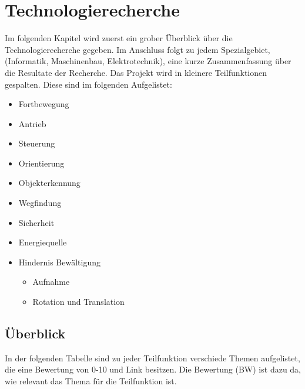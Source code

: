 \documentclass[../main.tex]{subfiles}
\begin{document}
\newpage
\section{Technologierecherche}

Im folgenden Kapitel wird zuerst ein grober Überblick über die Technologierecherche gegeben. Im Anschluss folgt zu jedem Spezialgebiet, (Informatik, Maschinenbau, Elektrotechnik), eine kurze Zusammenfassung über die Resultate der Recherche. Das Projekt wird in kleinere Teilfunktionen gespalten. Diese sind im folgenden Aufgelistet:
\begin{itemize}
    \item Fortbewegung
    \item Antrieb
    \item Steuerung
    \item Orientierung
    \item Objekterkennung
    \item Wegfindung
    \item Sicherheit
    \item Energiequelle
    \item Hindernis Bewältigung
    \begin{itemize}
        \item Aufnahme
          \item Rotation und Translation
    \end{itemize}
\end{itemize}


\subsection{Überblick}
In der folgenden Tabelle sind zu jeder Teilfunktion verschiede Themen aufgelistet, die eine Bewertung von 0-10 und Link besitzen. Die Bewertung (BW) ist dazu da, wie relevant das Thema für die Teilfunktion ist.
\end{document}

